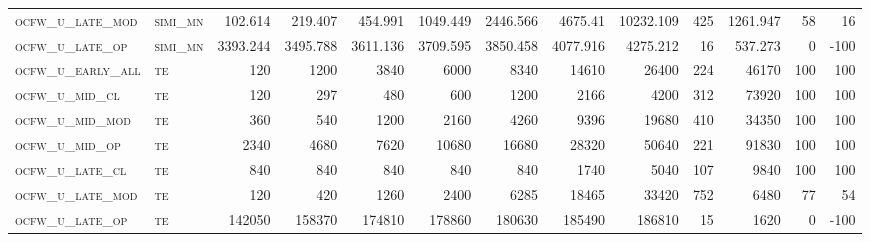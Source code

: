 \begin{landscape}
\begin{center}
\begin{footnotesize}
\begin{longtable}{llrrrrrrrr|rrr}
\textsc{ocfw\_u\_late\_mod } & \textsc{simi\_mn  }   & 102.614  & 219.407  & 454.991  & 1049.449 & 2446.566 & 4675.41  & 10232.109 & 425    & 1261.947      & 58            & 16              \\
\textsc{ocfw\_u\_late\_op  } & \textsc{simi\_mn  }   & 3393.244 & 3495.788 & 3611.136 & 3709.595 & 3850.458 & 4077.916 & 4275.212  & 16     & 537.273       & 0             & -100            \\
\textsc{ocfw\_u\_early\_all} & \textsc{te  	     }   & 120      & 1200     & 3840     & 6000     & 8340     & 14610    & 26400     & 224    & 46170         & 100           & 100             \\
\textsc{ocfw\_u\_mid\_cl   } & \textsc{te        }   & 120      & 297      & 480      & 600      & 1200     & 2166     & 4200      & 312    & 73920         & 100           & 100             \\
\textsc{ocfw\_u\_mid\_mod  } & \textsc{te        }   & 360      & 540      & 1200     & 2160     & 4260     & 9396     & 19680     & 410    & 34350         & 100           & 100             \\
\textsc{ocfw\_u\_mid\_op   } & \textsc{te        }   & 2340     & 4680     & 7620     & 10680    & 16680    & 28320    & 50640     & 221    & 91830         & 100           & 100             \\
\textsc{ocfw\_u\_late\_cl  } & \textsc{te        }   & 840      & 840      & 840      & 840      & 840      & 1740     & 5040      & 107    & 9840          & 100           & 100             \\
\textsc{ocfw\_u\_late\_mod } & \textsc{te        }   & 120      & 420      & 1260     & 2400     & 6285     & 18465    & 33420     & 752    & 6480          & 77            & 54              \\
\textsc{ocfw\_u\_late\_op  } & \textsc{te        }   & 142050   & 158370   & 174810   & 178860   & 180630   & 185490   & 186810    & 15     & 1620          & 0             & -100           


\end{longtable}
\end{footnotesize}
\end{center}
\end{landscape}

\restoregeometry
\pagestyle{headings}


